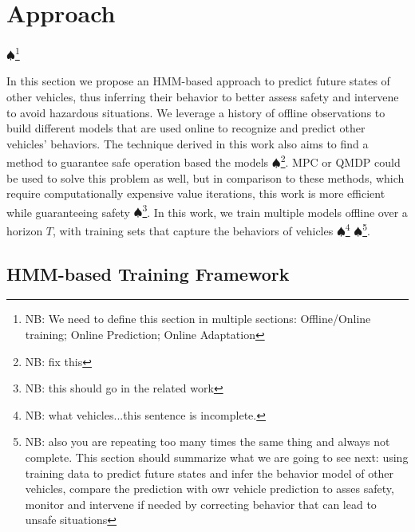 \documentclass[letterpaper, 10 pt, conference]{ieeeconf}  %
\newcommand\NB[1]{$\spadesuit$\footnote{NB: #1}}
\begin{document}
\section{Approach} \label{sec:approach}\NB{We need to define this section in multiple sections: Offline/Online training; Online Prediction; Online Adaptation}

In this section we propose an HMM-based approach to predict future states of other vehicles, thus inferring their behavior to better assess safety and intervene to avoid hazardous situations. We leverage a history of offline observations to build different models that are used online to recognize and predict other vehicles' behaviors. The technique derived in this work also aims to find a method to guarantee safe operation based the models \NB{fix this}. %
MPC\cite{mpc} or QMDP\cite{qmdp} could be used to solve this problem as well, but in comparison to these methods, which require computationally expensive value iterations, this work is more efficient while guaranteeing safety \NB{this should go in the related work}. In this work, we train multiple models offline over a horizon $T$, with training sets that capture the behaviors of vehicles \NB{what vehicles...this sentence is incomplete.} \NB{also you are repeating too many times the same thing and always not complete. This section should summarize what we are going to see next: using training data to predict future states and infer the behavior model of other vehicles, compare the prediction with owr vehicle prediction to asses safety, monitor and intervene if needed by correcting behavior that can lead to unsafe situations}.


\subsection{HMM-based Training Framework} \label{sec:fmwk}
\end{document}
